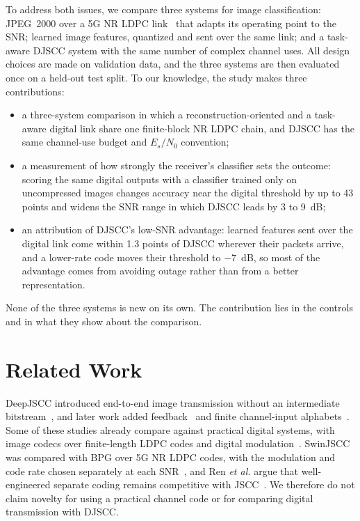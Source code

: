 \documentclass[conference]{IEEEtran}
\begin{document}
To address both issues, we compare three systems for image classification: JPEG~2000 over a 5G NR LDPC link~\cite{jpeg2000,3gpp38212} that adapts its operating point to the SNR; learned image features, quantized and sent over the same link; and a task-aware DJSCC system with the same number of complex channel uses. All design choices are made on validation data, and the three systems are then evaluated once on a held-out test split. To our knowledge, the study makes three contributions:
\begin{itemize}
\item a three-system comparison in which a reconstruction-oriented and a task-aware digital link share one finite-block NR LDPC chain, and DJSCC has the same channel-use budget and $E_s/N_0$ convention;
\item a measurement of how strongly the receiver's classifier sets the outcome: scoring the same digital outputs with a classifier trained only on uncompressed images changes accuracy near the digital threshold by up to 43 points and widens the SNR range in which DJSCC leads by 3 to 9~dB;
\item an attribution of DJSCC's low-SNR advantage: learned features sent over the digital link come within 1.3 points of DJSCC wherever their packets arrive, and a lower-rate code moves their threshold to $-7$~dB, so most of the advantage comes from avoiding outage rather than from a better representation.
\end{itemize}
None of the three systems is new on its own. The contribution lies in the controls and in what they show about the comparison.

\section{Related Work}
DeepJSCC introduced end-to-end image transmission without an intermediate bitstream~\cite{bourtsoulatze2019}, and later work added feedback~\cite{kurka2020feedback} and finite channel-input alphabets~\cite{tung2022}. Some of these studies already compare against practical digital systems, with image codecs over finite-length LDPC codes and digital modulation~\cite{kurka2020feedback,tung2022}. SwinJSCC was compared with BPG over 5G NR LDPC codes, with the modulation and code rate chosen separately at each SNR~\cite{yang2025swinjscc}, and Ren \emph{et al.} argue that well-engineered separate coding remains competitive with JSCC~\cite{ren2025separate}. We therefore do not claim novelty for using a practical channel code or for comparing digital transmission with DJSCC.
\end{document}
